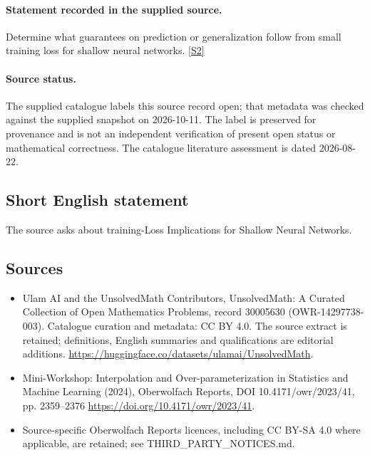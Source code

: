 \documentclass[11pt]{article}
\begin{document}
\paragraph{Statement recorded in the supplied source.}
Determine what guarantees on prediction or generalization follow from small training loss for shallow neural networks. \href{https://doi.org/10.4171/owr/2023/41}{[S2]}
\paragraph{Source status.}
The supplied catalogue labels this source record open; that metadata was checked against the supplied snapshot on 2026-10-11. The label is preserved for provenance and is not an independent verification of present open status or mathematical correctness. The catalogue literature assessment is dated 2026-08-22.
\subsection{Short English statement}
The source asks about training-Loss Implications for Shallow Neural Networks.
\subsection{Sources}
\begin{itemize}
\item[S1] Ulam AI and the UnsolvedMath Contributors, UnsolvedMath: A Curated Collection of Open Mathematics Problems, record 30005630 (OWR-14297738-003). Catalogue curation and metadata: CC BY 4.0. The source extract is retained; definitions, English summaries and qualifications are editorial additions.
\url{https://huggingface.co/datasets/ulamai/UnsolvedMath}.
\item[S2] Mini-Workshop: Interpolation and Over-parameterization in Statistics and Machine Learning​ (2024), Oberwolfach Reports, DOI 10.4171/owr/2023/41, pp. 2359--2376
\url{https://doi.org/10.4171/owr/2023/41}.
\item Source-specific Oberwolfach Reports licences, including CC BY-SA 4.0 where applicable, are retained; see THIRD\_PARTY\_NOTICES.md.
\end{itemize}
\end{document}
